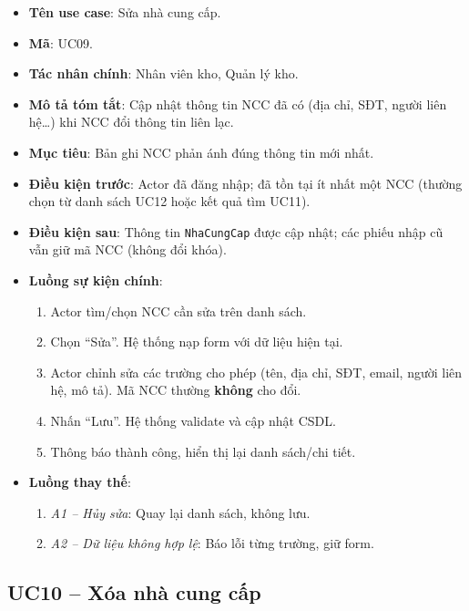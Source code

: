 \begin{itemize}[leftmargin=1.5cm]
    \item \textbf{Tên use case}: Sửa nhà cung cấp.
    \item \textbf{Mã}: UC09.
    \item \textbf{Tác nhân chính}: Nhân viên kho, Quản lý kho.
    \item \textbf{Mô tả tóm tắt}: Cập nhật thông tin NCC đã có (địa chỉ, SĐT, người liên hệ\ldots) khi NCC đổi thông tin liên lạc.
    \item \textbf{Mục tiêu}: Bản ghi NCC phản ánh đúng thông tin mới nhất.
    \item \textbf{Điều kiện trước}: Actor đã đăng nhập; đã tồn tại ít nhất một NCC (thường chọn từ danh sách UC12 hoặc kết quả tìm UC11).
    \item \textbf{Điều kiện sau}: Thông tin \texttt{NhaCungCap} được cập nhật; các phiếu nhập cũ vẫn giữ mã NCC (không đổi khóa).
    \item \textbf{Luồng sự kiện chính}:
    \begin{enumerate}
        \item Actor tìm/chọn NCC cần sửa trên danh sách.
        \item Chọn ``Sửa''. Hệ thống nạp form với dữ liệu hiện tại.
        \item Actor chỉnh sửa các trường cho phép (tên, địa chỉ, SĐT, email, người liên hệ, mô tả). Mã NCC thường \textbf{không} cho đổi.
        \item Nhấn ``Lưu''. Hệ thống validate và cập nhật CSDL.
        \item Thông báo thành công, hiển thị lại danh sách/chi tiết.
    \end{enumerate}
    \item \textbf{Luồng thay thế}:
    \begin{enumerate}
        \item \textit{A1 -- Hủy sửa}: Quay lại danh sách, không lưu.
        \item \textit{A2 -- Dữ liệu không hợp lệ}: Báo lỗi từng trường, giữ form.
    \end{enumerate}
\end{itemize}

\subsection{UC10 -- Xóa nhà cung cấp}

